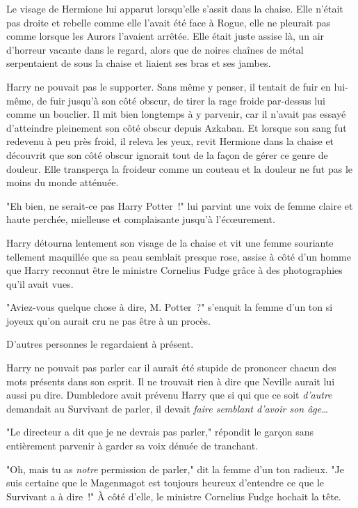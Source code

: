 Le visage de Hermione lui apparut lorsqu'elle s'assit dans la chaise. Elle n'était pas droite et rebelle comme elle l'avait été face à Rogue, elle ne pleurait pas comme lorsque les Aurors l'avaient arrêtée. Elle était juste assise là, un air d'horreur vacante dans le regard, alors que de noires chaînes de métal serpentaient de sous la chaise et liaient ses bras et ses jambes.

Harry ne pouvait pas le supporter. Sans même y penser, il tentait de fuir en lui-même, de fuir jusqu'à son côté obscur, de tirer la rage froide par-dessus lui comme un bouclier. Il mit bien longtemps à y parvenir, car il n'avait pas essayé d'atteindre pleinement son côté obscur depuis Azkaban. Et lorsque son sang fut redevenu à peu près froid, il releva les yeux, revit Hermione dans la chaise et découvrit que son côté obscur ignorait tout de la façon de gérer ce genre de douleur. Elle transperça la froideur comme un couteau et la douleur ne fut pas le moins du monde atténuée.

"Eh bien, ne serait-ce pas Harry Potter~!" lui parvint une voix de femme claire et haute perchée, mielleuse et complaisante jusqu'à l'écœurement.

Harry détourna lentement son visage de la chaise et vit une femme souriante tellement maquillée que sa peau semblait presque rose, assise à côté d'un homme que Harry reconnut être le ministre Cornelius Fudge grâce à des photographies qu'il avait vues.

"Aviez-vous quelque chose à dire, M. Potter~?" s'enquit la femme d'un ton si joyeux qu'on aurait cru ne pas être à un procès.

D'autres personnes le regardaient à présent.

Harry ne pouvait pas parler car il aurait été stupide de prononcer chacun des mots présents dans son esprit. Il ne trouvait rien à dire que Neville aurait lui aussi pu dire. Dumbledore avait prévenu Harry que si qui que ce soit \emph{d'autre} demandait au Survivant de parler, il devait \emph{faire semblant d'avoir son âge…}

"Le directeur a dit que je ne devrais pas parler," répondit le garçon sans entièrement parvenir à garder sa voix dénuée de tranchant.

"Oh, mais tu as \emph{notre} permission de parler," dit la femme d'un ton radieux. "Je suis certaine que le Magenmagot est toujours heureux d'entendre ce que le Survivant a à dire~!" À côté d'elle, le ministre Cornelius Fudge hochait la tête.

